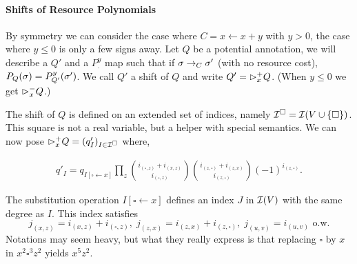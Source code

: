 \documentclass[nocopyrightspace,preprint]{sigplanconf-pldi15}
\begin{document}
\paragraph{Shifts of Resource Polynomials}

By symmetry we can consider the case where $C=x \gets x+y$ with
$y>0$, the case where $y \le 0$ is only a few signs away.  Let
$Q$ be a potential annotation, we will describe a $Q'$ and a
$P^y_.$ map such that if $\sigma \rightarrow_C \sigma'$ (with no resource cost),
$P_Q(\sigma) = P^y_{Q'}(\sigma')$.  We call $Q'$ a shift of $Q$ and
write $Q' = {\rhd}_x^+ Q$.  (When $y\le0$ we get ${\rhd}_x^-Q$.)

The shift of $Q$ is defined on an extended set of indices, namely
$\mathcal{I}^\square = \mathcal{I}(V \cup \{\square\})$.  This square is not a real
variable, but a helper with special semantics.
We can now pose ${\rhd}_x^+ Q = (q'_I)_{I\in\mathcal{I}^\square}$ where,

\begin{align*}
q'_I =
q_{I[\square \gets x]}
\prod_z
   \binom{i_{(\square,z)} {+} i_{(x,z)}}{i_{(\square,z)}}
   \binom{i_{(z,\square)} {+} i_{(z,x)}}{i_{(z,\square)}}
   (-1)^{i_{(z,\square)}}
   .
\end{align*}

The substitution operation $I[\square \gets x]$ defines an index $J$
in $\mathcal{I}(V)$ with the same degree as $I$.  This index satisfies
$$
j_{(x,z)} {=} i_{(x,z)} {+} i_{(\square,z)}, \;
j_{(z,x)} {=} i_{(z,x)} {+} i_{(z,\square)}, \;
j_{(u,v)} {=} i_{(u,v)} \mbox{ o.w.}
$$
Notations may seem heavy, but what they really express is that
replacing $\square$ by $x$ in $x^2\square^3z^2$ yields $x^5z^2$.
\end{document}
